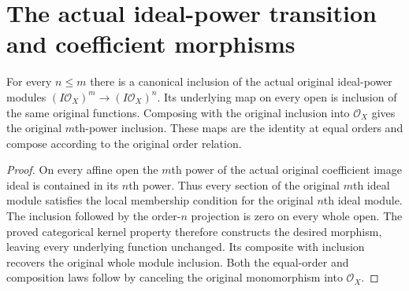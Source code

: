 \section{The actual ideal-power transition and coefficient morphisms}

\begin{lemma}
\label{lem:fibre-ideal-power-module-inclusions}
\leanok
For every $n\le m$ there is a canonical inclusion of the actual original
ideal-power modules $(I\mathcal O_X)^m\to(I\mathcal O_X)^n$. Its
underlying map on every open is inclusion of the same original
functions. Composing with the original inclusion into $\mathcal O_X$
gives the original $m$th-power inclusion. These maps are the identity
at equal orders and compose according to the original order relation.
\end{lemma}
\begin{proof}
On every affine open the $m$th power of the actual original coefficient
image ideal is contained in its $n$th power. Thus every section of the
original $m$th ideal module satisfies the local membership condition
for the original $n$th ideal module. The inclusion followed by the
order-$n$ projection is zero on every whole open. The proved categorical
kernel property therefore constructs the desired morphism, leaving
every underlying function unchanged. Its composite with inclusion
recovers the original whole module inclusion. Both the equal-order
and composition laws follow by canceling the original monomorphism
into $\mathcal O_X$.
\end{proof}

